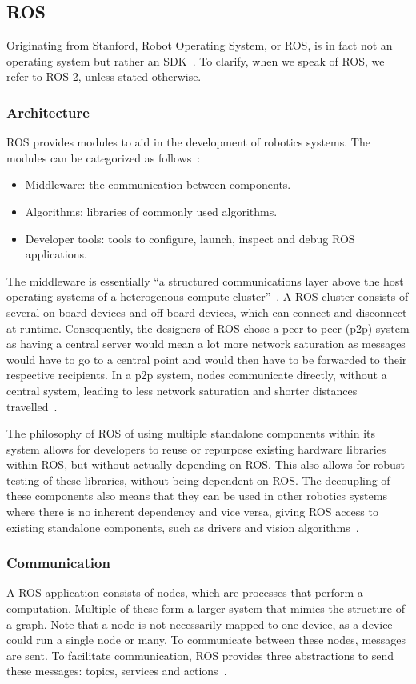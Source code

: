 \documentclass[a4paper]{book}
\begin{document}
\subsection{ROS}
\label{sec:ros}
Originating from Stanford, Robot Operating System, or ROS, is in fact not
an operating system but rather an SDK~\cite{macenski2022robot}.
To clarify, when we speak of ROS, we refer to ROS 2, unless stated otherwise.
\subsubsection{Architecture}
ROS provides modules to aid in the development of robotics systems.
The modules can be categorized as follows~\cite{macenski2022robot}:
\begin{itemize}
	\item Middleware: the communication between components.
    \item Algorithms: libraries of commonly used algorithms.
    \item Developer tools: tools to configure, launch, inspect and debug
        ROS applications.
\end{itemize}
The middleware is essentially \enquote{a structured communications layer above
the host operating systems of a heterogenous compute
cluster}~\cite{quigley2009ros}. A ROS cluster consists of several on-board
devices and off-board devices, which can connect and disconnect at runtime.
Consequently, the designers of ROS chose a peer-to-peer (p2p) system as having a
central server would mean a lot more network saturation as messages would have
to go to a central point and would then have to be forwarded to their respective
recipients. In a p2p system, nodes communicate directly, without a central
system, leading to less network saturation and shorter distances
travelled~\cite{quigley2009ros}.
\par
The philosophy of ROS of using multiple standalone components within its system
allows for developers to reuse or repurpose existing hardware libraries within
ROS, but without actually depending on ROS. This also allows for robust testing
of these libraries, without being dependent on ROS. The decoupling of these
components also means that they can be used in other robotics systems where
there is no inherent dependency and vice versa, giving ROS access to existing
standalone components, such as drivers and vision algorithms~\cite{quigley2009ros}.
\subsubsection{Communication}
A ROS application consists of nodes, which are processes that perform a
computation. Multiple of these form a larger system that mimics the structure of
a graph. Note that a node is not necessarily mapped to one device, as a device
could run a single node or many. To communicate between these nodes, messages
are sent. To facilitate communication, ROS provides three abstractions to send
these messages: topics, services and actions~\cite{macenski2022robot}.
\end{document}
